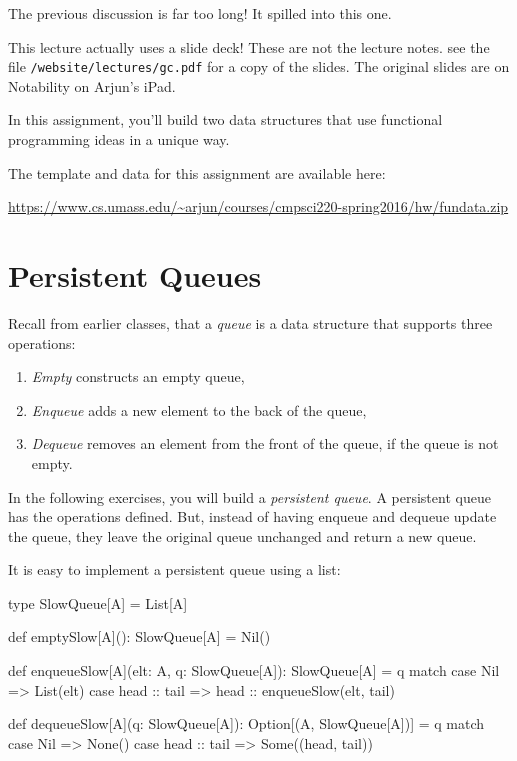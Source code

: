 \documentclass{book}
\begin{document}

The previous discussion is far too long! It spilled into this one.

\newlecture

This lecture actually uses a slide deck! These are not the lecture notes.
see the file \texttt{/website/lectures/gc.pdf} for a copy of the slides.
The original slides are on Notability on Arjun's iPad.


In this assignment, you'll build two data structures that use functional
programming ideas in a unique way.

The template and data for this assignment are available here:

\url{https://www.cs.umass.edu/~arjun/courses/cmpsci220-spring2016/hw/fundata.zip}

\section{Persistent Queues}

Recall from earlier classes, that a \emph{queue} is a data structure that
supports three operations:

\begin{enumerate}

\item \emph{Empty} constructs an empty queue,

\item \emph{Enqueue} adds a new element to the back of the queue,

\item \emph{Dequeue} removes an element from the front of the queue, if the queue is
  not empty.

\end{enumerate}

In the following exercises, you will build a \emph{persistent queue}. A
persistent queue has the operations defined. But, instead of having enqueue and
dequeue update the queue, they leave the original queue unchanged and return a
new queue.

It is easy to implement a persistent queue using a list:

\begin{scalacode}
type SlowQueue[A] = List[A]

def emptySlow[A](): SlowQueue[A] = Nil()

def enqueueSlow[A](elt: A, q: SlowQueue[A]): SlowQueue[A] = q match {
  case Nil => List(elt)
  case head :: tail => head :: enqueueSlow(elt, tail)
}

def dequeueSlow[A](q: SlowQueue[A]): Option[(A, SlowQueue[A])] = q match {
  case Nil => None()
  case head :: tail => Some((head, tail))
}
\end{scalacode}
\end{document}
